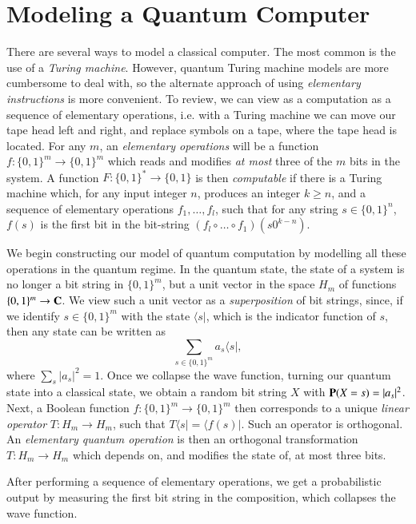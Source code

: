 \chapter{Modeling a Quantum Computer}

There are several ways to model a classical computer. The most common is the use of a \emph{Turing machine}. However, quantum Turing machine models are more cumbersome to deal with, so the alternate approach of using \emph{elementary instructions} is more convenient. To review, we can view as a computation as a sequence of elementary operations, i.e. with a Turing machine we can move our tape head left and right, and replace symbols on a tape, where the tape head is located. For any $m$, an \emph{elementary operations} will be a function $f: \{ 0, 1 \}^m \to \{ 0, 1 \}^m$ which reads and modifies \emph{at most} three of the $m$ bits in the system. A function $F: \{ 0, 1 \}^* \to \{ 0, 1 \}$ is then \emph{computable} if there is a Turing machine which, for any input integer $n$, produces an integer $k \geq n$, and a sequence of elementary operations $f_1,\dots,f_l$, such that for any string $s \in \{ 0, 1 \}^n$, $f(s)$ is the first bit in the bit-string $(f_l \circ \dots \circ f_1)(s0^{k-n})$.

We begin constructing our model of quantum computation by modelling all these operations in the quantum regime. In the quantum state, the state of a system is no longer a bit string in $\{ 0, 1 \}^m$, but a unit vector in the space $H_m$ of functions $\{ 0, 1 \}^m \to \operatorname{\mathbf{C}}$. We view such a unit vector as a \emph{superposition} of bit strings, since, if we identify $s \in \{ 0, 1 \}^m$ with the state $\langle s |$, which is the indicator function of $s$, then any state can be written as
%
\[ \sum_{s \in \{ 0, 1 \}^m} a_s \langle s |, \]
%
where $\sum_s |a_s|^2 = 1$. Once we collapse the wave function, turning our quantum state into a classical state, we obtain a random bit string $X$ with $\operatorname{\mathbf{P}}(X = s) = |a_s|^2$. Next, a Boolean function $f: \{ 0, 1 \}^m \to \{ 0, 1 \}^m$ then corresponds to a unique \emph{linear operator} $T: H_m \to H_m$, such that $T \langle s | = \langle f(s) |$. Such an operator is orthogonal. An \emph{elementary quantum operation} is then an orthogonal transformation $T: H_m \to H_m$ which depends on, and modifies the state of, at most three bits.

After performing a sequence of elementary operations, we get a probabilistic output by measuring the first bit string in the composition, which collapses the wave function.

